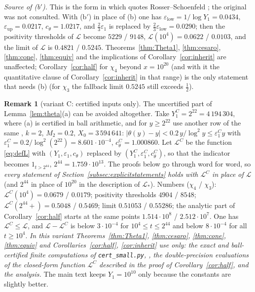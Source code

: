 \documentclass[11pt]{amsart}
\theoremstyle{definition}
\newtheorem{remark}[theorem]{Remark}
\numberwithin{equation}{section}
\newcommand{\eps}{\varepsilon}
\newcommand{\cL}{\mathcal L}          %
\begin{document}
\noindent\emph{Source of \textup{(b$'$)}.} This is the form in which
\cite[Lemma~2.2, (2.2)]{Joh23} quotes Rosser--Schoenfeld
\cite[(3.15)--(3.16)]{RS62}; the original was not consulted. With
(b$'$) in place of (b) one has $\eps_{\mathrm{low}}=1/\log Y_1
=0.0434$, $\eps_{\mathrm{up}}=0.0217$, $c_\theta=1.0217$, and
$\tfrac23\eps_1$ is replaced by $\tfrac23\eps_{\mathrm{low}}=0.0290$;
then the positivity thresholds of $\cL$ become $5229$ / $9148$,
$\cL(10^4)=0.0622$ / $0.0103$, and the limit of $\cL$ is $0.4821$ /
$0.5245$. Theorems~\ref{thm:Theta1}, \ref{thm:cesaro},
\ref{thm:cone}, \ref{thm:equiv} and the implications of
Corollary~\ref{cor:inherit} are unaffected;
Corollary~\ref{cor:half} for $\chi_4$ beyond $x=10^{20}$ (and with it
the quantitative clause of Corollary~\ref{cor:inherit} in that range)
is the only statement that needs (b) (for $\chi_3$ the fallback limit
$0.5245$ still exceeds $\tfrac12$).

\begin{remark}[variant C: certified inputs only]\label{rem:variantC}
The uncertified part of Lemma~\ref{lem:theta}(a) can be avoided
altogether. Take $Y_1^{C}=2^{22}=4\,194\,304$, where (a) is certified
in ball arithmetic, and for $y\ge2^{22}$ use another row of the same
\cite[Corollary~11.2]{BKLNW21}, $k=2$, $M_2=0.2$,
$X_0=3\,594\,641$: $|\theta(y)-y|<0.2\,y/\log^2y\le\eps_1^{C}y$ with
$\eps_1^{C}=0.2/\log^2(2^{22})=8.601\cdot10^{-4}$,
$c_\theta^{C}=1.000860$. Let $\cL^{C}$ be the function
\eqref{eq:defL} with $(Y_1,\eps_1,c_\theta)$ replaced by
$(Y_1^{C},\eps_1^{C},c_\theta^{C})$, so that the indicator becomes
$1_{t>2^{44}}$, $2^{44}=1.759\cdot10^{13}$. The proofs below go
through word for word, so \emph{every statement of
Section~\ref{subsec:explicitstatements} holds with $\cL^{C}$ in place
of $\cL$} (and $2^{44}$ in place of $10^{20}$ in the description of
$\cL_*$). Numbers ($\chi_4$ / $\chi_3$): $\cL^{C}(10^4)=0.0679$ /
$0.0179$; positivity thresholds $4904$ / $8548$;
$\cL^{C}(2^{44}+)=0.5048$ / $0.5469$; limit $0.51053$ / $0.55286$;
the analytic part of Corollary~\ref{cor:half} starts at the same
points $1.514\cdot10^8$ / $2.512\cdot10^7$. One has
$\cL^{C}\le\cL$, and $\cL-\cL^{C}$ is below $3\cdot10^{-4}$ for
$10^4\le t\le2^{44}$ and below $8\cdot10^{-4}$ for all $t\ge10^4$.
\emph{In this variant Theorems~\ref{thm:Theta1}, \ref{thm:cesaro},
\ref{thm:cone}, \ref{thm:equiv} and
Corollaries~\ref{cor:half}, \ref{cor:inherit} use only: the exact and
ball-certified finite computations of
\textup{\texttt{cert\_small.py}}, \cite[Corollary~11.2]{BKLNW21}, the
double-precision evaluations of the closed-form function $\cL^{C}$
described in the proof of Corollary~\ref{cor:half}, and the
analysis.} The main text keeps $Y_1=10^{10}$ only because the
constants are slightly better.
\end{remark}
\end{document}
